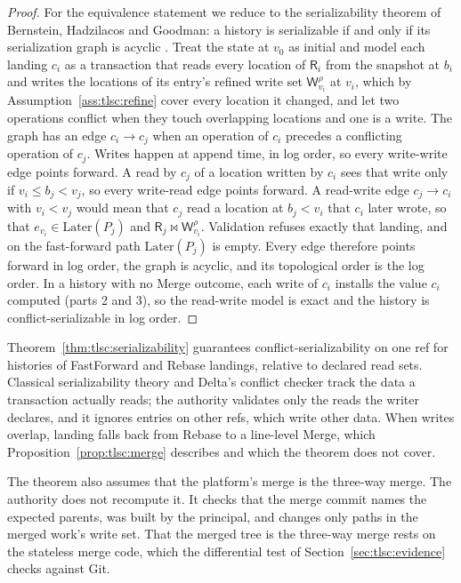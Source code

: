 \documentclass[11pt,letterpaper]{article}
\theoremstyle{definition}
\theoremstyle{remark}
\newcommand{\R}{\mathsf{R}}
\newcommand{\W}{\mathsf{W}}
\newcommand{\meets}{\bowtie}
\newcommand{\Later}{\mathrm{Later}}
\begin{document}
\begin{proof}
For the equivalence statement we reduce to the serializability theorem of Bernstein, Hadzilacos and Goodman: a history is serializable if and only if its serialization graph is acyclic \cite[Theorem 2.1]{bhg1987}. Treat the state at $v_0$ as initial and model each landing $c_i$ as a transaction that reads every location of $\R_i$ from the snapshot at $b_i$ and writes the locations of its entry's refined write set $\W^{\rho}_{v_i}$ at $v_i$, which by Assumption~\ref{ass:tlsc:refine} cover every location it changed, and let two operations conflict when they touch overlapping locations and one is a write. The graph has an edge $c_i\to c_j$ when an operation of $c_i$ precedes a conflicting operation of $c_j$. Writes happen at append time, in log order, so every write-write edge points forward. A read by $c_j$ of a location written by $c_i$ sees that write only if $v_i\leq b_j<v_j$, so every write-read edge points forward. A read-write edge $c_j\to c_i$ with $v_i<v_j$ would mean that $c_j$ read a location at $b_j<v_i$ that $c_i$ later wrote, so that $e_{v_i}\in\Later(P_j)$ and $\R_j\meets\W^{\rho}_{v_i}$. Validation refuses exactly that landing, and on the fast-forward path $\Later(P_j)$ is empty. Every edge therefore points forward in log order, the graph is acyclic, and its topological order is the log order. In a history with no Merge outcome, each write of $c_i$ installs the value $c_i$ computed (parts 2 and 3), so the read-write model is exact and the history is conflict-serializable in log order.
\end{proof}

Theorem~\ref{thm:tlsc:serializability} guarantees conflict-serializability on one ref for histories of FastForward and Rebase landings, relative to declared read sets. Classical serializability theory \cite{bhg1987} and Delta's conflict checker \cite{deltaconflictsrc} track the data a transaction actually reads; the authority validates only the reads the writer declares, and it ignores entries on other refs, which write other data. When writes overlap, landing falls back from Rebase to a line-level Merge, which Proposition~\ref{prop:tlsc:merge} describes and which the theorem does not cover.

The theorem also assumes that the platform's merge is the three-way merge. The authority does not recompute it. It checks that the merge commit names the expected parents, was built by the  principal, and changes only paths in the merged work's write set. That the merged tree is the three-way merge rests on the stateless merge code, which the differential test of Section~\ref{sec:tlsc:evidence} checks against Git.
\end{document}
